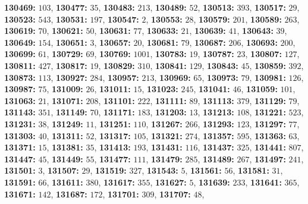 \textsf{\bfseries 130469:} $103$, \textsf{\bfseries 130477:} $35$, \textsf{\bfseries 130483:} $213$, \textsf{\bfseries 130489:} $52$, \textsf{\bfseries 130513:} $393$, \textsf{\bfseries 130517:} $29$, \textsf{\bfseries 130523:} $543$, \textsf{\bfseries 130531:} $197$, \textsf{\bfseries 130547:} $2$, \textsf{\bfseries 130553:} $28$, \textsf{\bfseries 130579:} $201$, \textsf{\bfseries 130589:} $263$, \textsf{\bfseries 130619:} $70$, \textsf{\bfseries 130621:} $50$, \textsf{\bfseries 130631:} $77$, \textsf{\bfseries 130633:} $21$, \textsf{\bfseries 130639:} $41$, \textsf{\bfseries 130643:} $39$, \textsf{\bfseries 130649:} $154$, \textsf{\bfseries 130651:} $3$, \textsf{\bfseries 130657:} $20$, \textsf{\bfseries 130681:} $79$, \textsf{\bfseries 130687:} $206$, \textsf{\bfseries 130693:} $200$, \textsf{\bfseries 130699:} $61$, \textsf{\bfseries 130729:} $69$, \textsf{\bfseries 130769:} $1001$, \textsf{\bfseries 130783:} $19$, \textsf{\bfseries 130787:} $23$, \textsf{\bfseries 130807:} $127$, \textsf{\bfseries 130811:} $427$, \textsf{\bfseries 130817:} $19$, \textsf{\bfseries 130829:} $310$, \textsf{\bfseries 130841:} $129$, \textsf{\bfseries 130843:} $45$, \textsf{\bfseries 130859:} $392$, \textsf{\bfseries 130873:} $113$, \textsf{\bfseries 130927:} $284$, \textsf{\bfseries 130957:} $213$, \textsf{\bfseries 130969:} $65$, \textsf{\bfseries 130973:} $79$, \textsf{\bfseries 130981:} $126$, \textsf{\bfseries 130987:} $75$, \textsf{\bfseries 131009:} $26$, \textsf{\bfseries 131011:} $15$, \textsf{\bfseries 131023:} $245$, \textsf{\bfseries 131041:} $46$, \textsf{\bfseries 131059:} $101$, \textsf{\bfseries 131063:} $21$, \textsf{\bfseries 131071:} $208$, \textsf{\bfseries 131101:} $222$, \textsf{\bfseries 131111:} $89$, \textsf{\bfseries 131113:} $379$, \textsf{\bfseries 131129:} $79$, \textsf{\bfseries 131143:} $351$, \textsf{\bfseries 131149:} $70$, \textsf{\bfseries 131171:} $183$, \textsf{\bfseries 131203:} $13$, \textsf{\bfseries 131213:} $108$, \textsf{\bfseries 131221:} $523$, \textsf{\bfseries 131231:} $38$, \textsf{\bfseries 131249:} $11$, \textsf{\bfseries 131251:} $110$, \textsf{\bfseries 131267:} $266$, \textsf{\bfseries 131293:} $123$, \textsf{\bfseries 131297:} $77$, \textsf{\bfseries 131303:} $40$, \textsf{\bfseries 131311:} $52$, \textsf{\bfseries 131317:} $105$, \textsf{\bfseries 131321:} $274$, \textsf{\bfseries 131357:} $595$, \textsf{\bfseries 131363:} $63$, \textsf{\bfseries 131371:} $15$, \textsf{\bfseries 131381:} $35$, \textsf{\bfseries 131413:} $193$, \textsf{\bfseries 131431:} $116$, \textsf{\bfseries 131437:} $325$, \textsf{\bfseries 131441:} $807$, \textsf{\bfseries 131447:} $45$, \textsf{\bfseries 131449:} $55$, \textsf{\bfseries 131477:} $111$, \textsf{\bfseries 131479:} $285$, \textsf{\bfseries 131489:} $267$, \textsf{\bfseries 131497:} $241$, \textsf{\bfseries 131501:} $3$, \textsf{\bfseries 131507:} $29$, \textsf{\bfseries 131519:} $327$, \textsf{\bfseries 131543:} $5$, \textsf{\bfseries 131561:} $56$, \textsf{\bfseries 131581:} $31$, \textsf{\bfseries 131591:} $66$, \textsf{\bfseries 131611:} $380$, \textsf{\bfseries 131617:} $355$, \textsf{\bfseries 131627:} $5$, \textsf{\bfseries 131639:} $233$, \textsf{\bfseries 131641:} $365$, \textsf{\bfseries 131671:} $142$, \textsf{\bfseries 131687:} $172$, \textsf{\bfseries 131701:} $309$, \textsf{\bfseries 131707:} $48$, 
